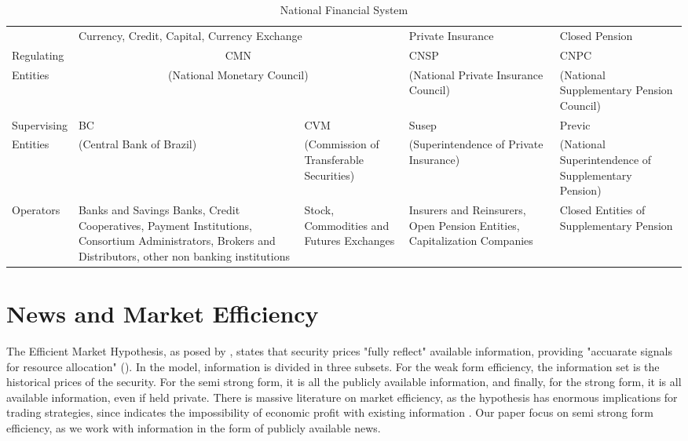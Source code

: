 \documentclass[a4paper]{article}
\begin{document}
\begin{table}[H]
\caption{National Financial System}
\label{tab:sistemanacional}
\centering
\begin{tabular}{lp{2.5cm}|p{2.5cm}|p{2.5cm}|p{2.5cm}}
 & \multicolumn{2}{p{5cm}||}{Currency, Credit, Capital, Currency Exchange} & \multicolumn{1}{l||}{Private Insurance} & \multicolumn{1}{l}{Closed Pension} \\ \cline{2-5} 
\multicolumn{1}{l|}{Regulating} & \multicolumn{2}{c||}{CMN} & \multicolumn{1}{p{2.5cm}||}{CNSP} & \multicolumn{1}{p{2.5cm}|}{CNPC} \\
\multicolumn{1}{l|}{Entities} & \multicolumn{2}{c||}{(National Monetary Council)} & \multicolumn{1}{p{2.5cm}||}{(National Private Insurance Council)} & \multicolumn{1}{p{2.5cm}|}{(National Supplementary Pension Council)} \\ \hline
\multicolumn{1}{l|}{Supervising} & \multicolumn{1}{p{2.5cm}||}{BC} & \multicolumn{1}{p{2.5cm}||}{CVM} & \multicolumn{1}{p{2.5cm}||}{Susep} & \multicolumn{1}{p{2.5cm}|}{Previc} \\
\multicolumn{1}{l|}{Entities} & \multicolumn{1}{p{2.5cm}||}{(Central Bank of Brazil)} & \multicolumn{1}{p{2.5cm}||}{(Commission of Transferable Securities)} & \multicolumn{1}{p{2.75cm}||}{(Superintendence of Private Insurance)} & \multicolumn{1}{p{2.5cm}|}{(National Superintendence of Supplementary Pension)} \\ \hline
\multicolumn{1}{l|}{Operators} & \multicolumn{1}{p{2.5cm}||}{Banks and Savings Banks,  Credit Cooperatives, Payment Institutions, Consortium Administrators, Brokers and Distributors, other non banking institutions} & \multicolumn{1}{p{2.5cm}||}{Stock, Commodities and Futures Exchanges} & \multicolumn{1}{p{2.5cm}||}{Insurers and Reinsurers, Open Pension Entities, Capitalization Companies} & \multicolumn{1}{p{2.5cm}|}{Closed Entities of Supplementary Pension} \\ \cline{2-5} 
\end{tabular}
\end{table}

\section{News and Market Efficiency}

The Efficient Market Hypothesis, as posed by \citet{fama1970}, states that security prices "fully reflect" available information, providing "accuarate signals for resource allocation" (\citet{fama1970}). In the model, information is divided in three subsets. For the weak form efficiency, the information set is the historical prices of the security. For the semi strong form, it is all the publicly available information, and finally, for the strong form, it is all available information, even if held private. There is massive literature on market efficiency, as the hypothesis has enormous implications for trading strategies, since indicates the impossibility of economic profit with existing information \citet{kamal2014}. Our paper focus on semi strong form efficiency, as we work with information in the form of publicly available news.
\end{document}
